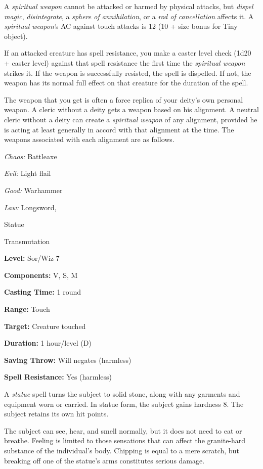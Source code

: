 \documentclass{article}
\begin{document}
A \textit{spiritual weapon }cannot be attacked or harmed by physical attacks, but 
\textit{dispel magic}, \textit{disintegrate}, a \textit{sphere of annihilation}, 
or a \textit{rod of cancellation }affects it. A \textit{spiritual weapon'}s AC 
against touch attacks is 12 (10 + size bonus for Tiny object).

If an attacked creature has spell resistance, you make a caster level check (1d20 
+ caster level) against that spell resistance the first time the \textit{spiritual 
weapon }strikes it. If the weapon is successfully resisted, the spell is dispelled. 
If not, the weapon has its normal full effect on that creature for the duration 
of the spell.

The weapon that you get is often a force replica of your deity's own personal weapon. 
A cleric without a deity gets a weapon based on his alignment. A neutral cleric 
without a deity can create a \textit{spiritual weapon }of any alignment, provided 
he is acting at least generally in accord with that alignment at the time. The 
weapons associated with each alignment are as follows.

\textit{Chaos: }Battleaxe

\textit{Evil: }Light flail

\textit{Good: }Warhammer

\textit{Law: }Longsword, 

\vspace{12pt}
Statue

Transmutation

\textbf{Level:} Sor/Wiz 7

\textbf{Components:} V, S, M

\textbf{Casting Time:} 1 round

\textbf{Range:} Touch

\textbf{Target:} Creature touched

\textbf{Duration:} 1 hour/level (D)

\textbf{Saving Throw: }Will negates (harmless)

\textbf{Spell Resistance:} Yes (harmless)

A \textit{statue }spell turns the subject to solid stone, along with any garments 
and equipment worn or carried. In statue form, the subject gains hardness 8. The 
subject retains its own hit points.

The subject can see, hear, and smell normally, but it does not need to eat or breathe. 
Feeling is limited to those sensations that can affect the granite-hard substance 
of the individual's body. Chipping is equal to a mere scratch, but breaking off 
one of the statue's arms constitutes serious damage.
\end{document}
